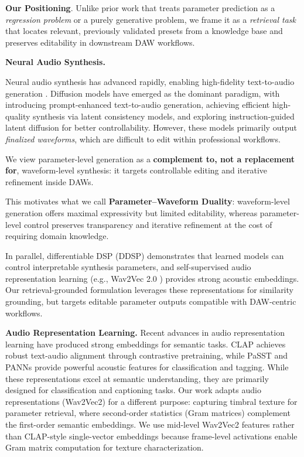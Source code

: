 \textbf{Our Positioning}. Unlike prior work that treats parameter prediction as a \textit{regression problem} or a purely generative problem, we frame it as a \textit{retrieval task} that locates relevant, previously validated presets from a knowledge base and preserves editability in downstream DAW workflows.

\noindent\textbf{Neural Audio Synthesis.}

Neural audio synthesis has advanced rapidly, enabling high-fidelity text-to-audio generation \citep{liu2023audioldm,liu2024audioldm2,agostinelli2023musiclm,vyas2023audiobox}. Diffusion models have emerged as the dominant paradigm, with \citet{huang2022makeanaudio} introducing prompt-enhanced text-to-audio generation, \citet{wang2023audiolcm} achieving efficient high-quality synthesis via latent consistency models, and \citet{liang2024instruction} exploring instruction-guided latent diffusion for better controllability. However, these models primarily output \textit{finalized waveforms}, which are difficult to edit within professional workflows.

We view parameter-level generation as a \textbf{complement to, not a replacement for}, waveform-level synthesis: it targets controllable editing and iterative refinement inside DAWs.

This motivates what we call \textbf{Parameter--Waveform Duality}: waveform-level generation offers maximal expressivity but limited editability, whereas parameter-level control preserves transparency and iterative refinement at the cost of requiring domain knowledge.

In parallel, differentiable DSP (DDSP) \citep{engel2020ddsp} demonstrates that learned models can control interpretable synthesis parameters, and self-supervised audio representation learning (e.g., Wav2Vec 2.0 \citep{baevski2020wav2vec}) provides strong acoustic embeddings. Our retrieval-grounded formulation leverages these representations for similarity grounding, but targets editable parameter outputs compatible with DAW-centric workflows.

\noindent\textbf{Audio Representation Learning.}
Recent advances in audio representation learning have produced strong embeddings for semantic tasks. CLAP \citep{elizalde2023clap} achieves robust text-audio alignment through contrastive pretraining, while PaSST \citep{koutini2022passt} and PANNs \citep{kong2020panns} provide powerful acoustic features for classification and tagging. While these representations excel at semantic understanding, they are primarily designed for classification and captioning tasks. Our work adapts audio representations (Wav2Vec2) for a different purpose: capturing timbral texture for parameter retrieval, where second-order statistics (Gram matrices) complement the first-order semantic embeddings. We use mid-level Wav2Vec2 features rather than CLAP-style single-vector embeddings because frame-level activations enable Gram matrix computation for texture characterization.

